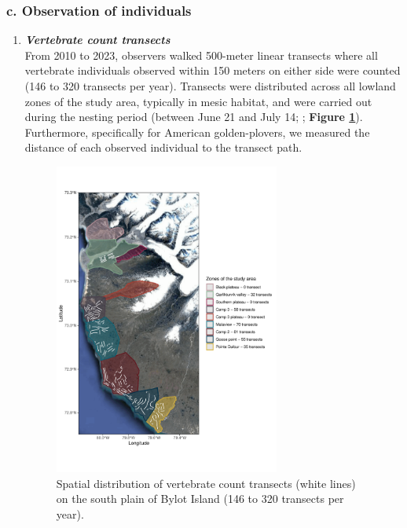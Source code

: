\documentclass[a4paper,twoside,12pt]{article}
\begin{document}
\subsubsection*{c. Observation of individuals}
\begin{enumerate}[label=\roman*]
\item[] \textit{\textbf{Vertebrate count transects}}\\
From 2010 to 2023, observers walked 500-meter linear transects where all vertebrate individuals observed within 150 meters on either side were counted (146 to 320 transects per year). Transects were distributed across all lowland zones of the study area, typically in mesic habitat, and were carried out during the nesting period (between June 21 and July 14; \citet{duchesne2021}; \textbf{Figure \ref{figure:transects}}). Furthermore, specifically for American golden-plovers, we measured the distance of each observed individual to the transect path.
\\
\begin{figure}
\centering
  \includegraphics[width=0.7\textwidth, angle=0]{figures/transects.pdf}
  \vspace{-35pt} %
  \caption{Spatial distribution of vertebrate count transects (white lines) on the south plain of Bylot Island (146 to 320 transects per year).}
 \label{figure:transects}

\end{figure}
\end{enumerate}
\end{document}
